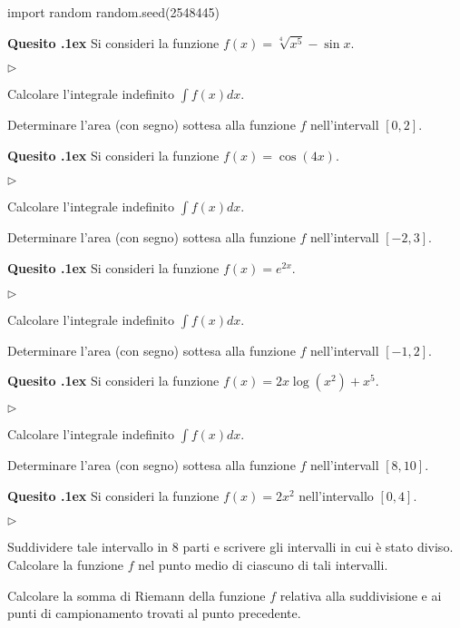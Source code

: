 \documentclass[11pt,twoside,a4paper]{article}
\newcommand{\mylabel}[1]{#1\hfill}
\renewenvironment{itemize}
  {\begin{list}{$\triangleright$}{%
   \setlength{\parskip}{0mm}
   \setlength{\topsep}{.4\baselineskip}
   \setlength{\rightmargin}{0mm}
   \setlength{\listparindent}{0mm}
   \setlength{\itemindent}{0mm}
   \setlength{\labelwidth}{2ex}
   \setlength{\itemsep}{.4\baselineskip}
   \setlength{\parsep}{0mm}
   \setlength{\partopsep}{0mm}
   \setlength{\labelsep}{1ex}
   \setlength{\leftmargin}{\labelwidth+\labelsep}
   \let\makelabel\mylabel}}{%
   \end{list}\vspace*{-1.3mm}}
\newcounter{quesito}
\newenvironment{question}{\bigskip\addtocounter{quesito}{1}\bigskip\bigskip\par\textbf{Quesito \thequesito.\kern1ex}}{\vspace{\parskip}}
\begin{document}
\begin{pycode}
import random
random.seed(2548445)
\end{pycode}
\begin{question}
Si consideri la funzione $f(x) = \sqrt[4]{x^5} - \sin x$.
\begin{itemize}
\item[1.] Calcolare l'integrale indefinito $\displaystyle \int f(x) dx$.
\item[2.] Determinare l'area (con segno) sottesa alla funzione $f$ nell'intervall $[0,2]$.
\end{itemize}
\end{question}
\begin{question}
Si consideri la funzione $f(x) = \cos(4x)$.
\begin{itemize}
\item[1.] Calcolare l'integrale indefinito $\displaystyle \int f(x) dx$.
\item[2.] Determinare l'area (con segno) sottesa alla funzione $f$ nell'intervall $[-2,3]$.
\end{itemize}
\end{question}
\begin{question}
Si consideri la funzione $f(x) = e^{2x}$.
\begin{itemize}
\item[1.] Calcolare l'integrale indefinito $\displaystyle \int f(x) dx$.
\item[2.] Determinare l'area (con segno) sottesa alla funzione $f$ nell'intervall $[-1,2]$.
\end{itemize}
\end{question}
\begin{question}
Si consideri la funzione $f(x) = 2x\log (x^2) + x^5$.
\begin{itemize}
\item[1.] Calcolare l'integrale indefinito $\displaystyle \int f(x) dx$.
\item[2.] Determinare l'area (con segno) sottesa alla funzione $f$ nell'intervall $[8,10]$.
\end{itemize}
\end{question}
\begin{question}
Si consideri la funzione $f(x) = 2x^2$ nell'intervallo $[0,4]$.
\begin{itemize}
\item[1.] Suddividere tale intervallo in $8$ parti e scrivere gli intervalli in cui \`e stato diviso. Calcolare la funzione $f$ nel punto medio di ciascuno di tali intervalli.
\item[2.] Calcolare la somma di Riemann della funzione $f$ relativa alla suddivisione e ai punti di campionamento trovati al punto precedente.
\end{itemize}
\end{question}
\end{document}
